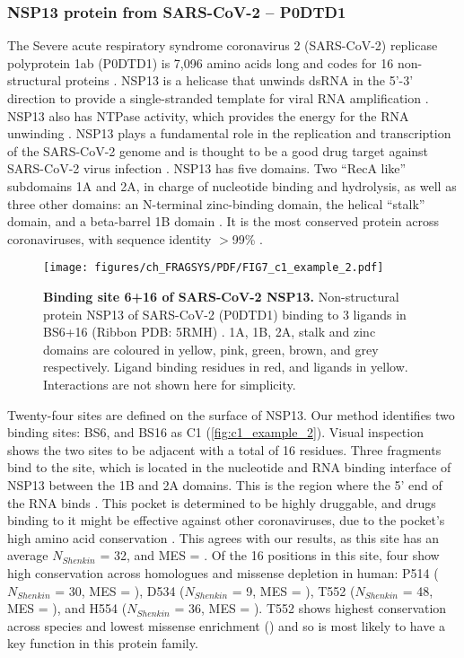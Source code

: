 \subsubsection{NSP13 protein from SARS-CoV-2 -- P0DTD1}

The Severe acute respiratory syndrome coronavirus 2 (SARS-CoV-2) replicase polyprotein 1ab (P0DTD1) is 7,096 amino acids long and codes for 16 non-structural proteins \cite{NAQVI_2020_SARSCOV2}. NSP13 is a helicase that unwinds dsRNA in the 5’-3’ direction to provide a single-stranded template for viral RNA amplification \cite{YUE_2022_SARSCOV2}. NSP13 also has NTPase activity, which provides the energy for the RNA unwinding \cite{SHU_2020_SARSCOV2}. NSP13 plays a fundamental role in the replication and transcription of the SARS-CoV-2 genome and is thought to be a good drug target against SARS-CoV-2 virus infection \cite{ZENG_2021_SARSCOV2}. NSP13 has five domains. Two ``RecA like'' subdomains 1A and 2A, in charge of nucleotide binding and hydrolysis, as well as three other domains: an N-terminal zinc-binding domain, the helical ``stalk'' domain, and a beta-barrel 1B domain \cite{ROMEO_2022_SARSCOV2}. It is the most conserved protein across coronaviruses, with sequence identity $>$99\% \cite{RICCI_2022_SARSCOV2}.

\begin{figure}[htb!]
    \centering
    \texttt{[image: figures/ch\_FRAGSYS/PDF/FIG7\_c1\_example\_2.pdf]}
    \caption[Binding site 6+16 of SARS-CoV-2 NSP13]{\textbf{Binding site 6+16 of SARS-CoV-2 NSP13.} Non-structural protein NSP13 of SARS-CoV-2 (P0DTD1) binding to 3 ligands in BS6+16 (Ribbon PDB: 5RMH) \cite{NEWMAN_2021_SARSCOV2}. 1A, 1B, 2A, stalk and zinc domains are coloured in yellow, pink, green, brown, and grey respectively. Ligand binding residues in red, and ligands in yellow. Interactions are not shown here for simplicity.}
    \label{fig:c1_example_2}
\end{figure}

Twenty-four sites are defined on the surface of NSP13. Our method identifies two binding sites: BS6, and BS16 as C1 (\autoref{fig:c1_example_2}). Visual inspection shows the two sites to be adjacent with a total of 16 residues. Three fragments bind to the site, which is located in the nucleotide and RNA binding interface of NSP13 between the 1B and 2A domains. This is the region where the 5’ end of the RNA binds \cite{YAN_2020_SARSCOV2}. This pocket is determined to be highly druggable, and drugs binding to it might be effective against other coronaviruses, due to the pocket’s high amino acid conservation \cite{NEWMAN_2021_SARSCOV2}. This agrees with our results, as this site has an average $N_{Shenkin}$ = 32, and MES = . Of the 16 positions in this site, four show high conservation across homologues and missense depletion in human: P514 ($N_{Shenkin}$ = 30, MES = ), D534 ($N_{Shenkin}$ = 9, MES = ), T552 ($N_{Shenkin}$ = 48, MES = ), and H554 ($N_{Shenkin}$ = 36, MES = ). T552 shows highest conservation across species and lowest missense enrichment () and so is most likely to have a key function in this protein family.

